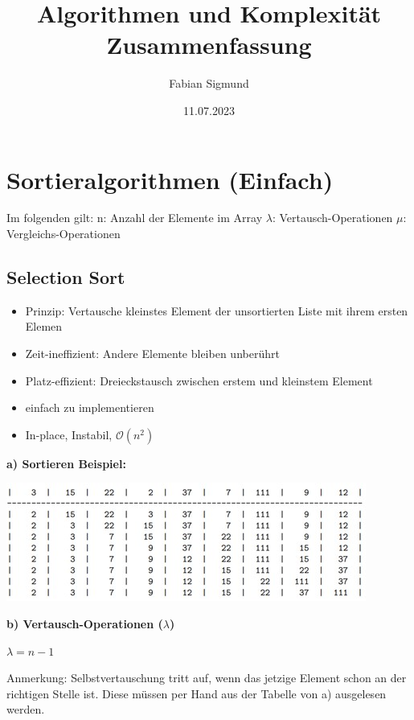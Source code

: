 \documentclass[12pt]{article}
\title{Algorithmen und Komplexität Zusammenfassung}
\author{Fabian Sigmund}
\date{11.07.2023}
\begin{document}
	\maketitle
	\pagebreak
	\section{Sortieralgorithmen (Einfach)}
	
	Im folgenden gilt:
	\newline
	n: Anzahl der Elemente im Array\newline
	$\lambda$: Vertausch-Operationen \newline
	$\mu$: Vergleichs-Operationen
	
	\subsection{Selection Sort}
	
	\begin{itemize}
		\item Prinzip: Vertausche kleinstes Element der unsortierten Liste mit ihrem ersten Elemen
		\item Zeit-ineffizient: Andere Elemente bleiben unberührt
		\item Platz-effizient: Dreieckstausch zwischen erstem und kleinstem Element
		\item einfach zu implementieren
		\item In-place, Instabil, $ \mathcal{O}(n^2) $ 
	\end{itemize}
	
	\textbf{a) Sortieren Beispiel:}
	
	\includegraphics{SelectionSort}
	\break
	
	\textbf{b) Vertausch-Operationen ($\lambda$)} \hfill \break
	
	\begin{center}
		$\lambda = n - 1$
	\end{center}
	
	Anmerkung: Selbstvertauschung tritt auf, wenn das jetzige Element schon an der richtigen Stelle ist. Diese müssen per Hand aus der Tabelle von a) ausgelesen werden.
\end{document}
